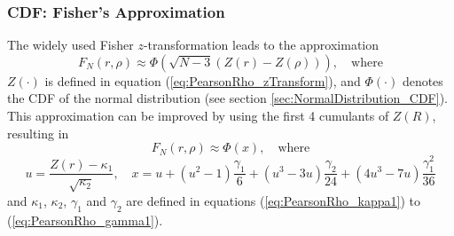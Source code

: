 \subsubsection{CDF: Fisher's Approximation}
The widely used Fisher $z$-transformation leads to the approximation
\begin{equation}
	F_N(r,\rho) \approx \Phi \left( \sqrt{N-3} \left(Z(r) - Z(\rho) \right) \right), \quad \text{where} 
\end{equation}
$Z(\cdot)$ is defined in equation  (\ref{eq:PearsonRho_zTransform}), and $\Phi(\cdot)$ denotes the CDF of the normal distribution (see section \ref{sec:NormalDistribution_CDF}). This approximation can be improved by using the first 4 cumulants of $Z(R)$, resulting in
\begin{equation}
	F_N(r,\rho) \approx \Phi \left(x \right), \quad \text{where}
\end{equation}
\begin{equation}
	u= \frac{Z(r) - \kappa_1}{\sqrt{\kappa_2}}, \quad x = u + (u^2 - 1) \frac{\gamma_1}{6} + (u^3 - 3 u) \frac{\gamma_2}{24} + (4 u^3 - 7u) \frac{\gamma_1^2}{36} 
\end{equation}
and $\kappa_1$, $\kappa_2$, $\gamma_1$ and $\gamma_2$ are defined in equations  (\ref{eq:PearsonRho_kappa1}) to  (\ref{eq:PearsonRho_gamma1}).

%
%





